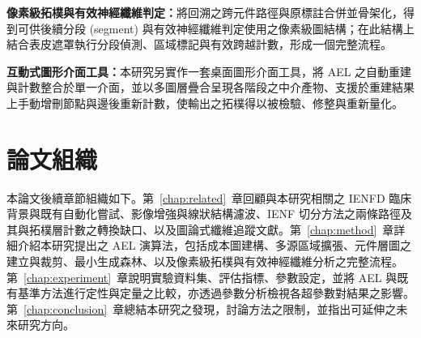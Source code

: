 \textbf{像素級拓樸與有效神經纖維判定：}將回溯之跨元件路徑與原標註合併並骨架化，得到可供後續分段 (segment) 與有效神經纖維判定使用之像素級圖結構；在此結構上結合表皮遮罩執行分段偵測、區域標記與有效跨越計數，形成一個完整流程。

\textbf{互動式圖形介面工具：}本研究另實作一套桌面圖形介面工具，將 AEL 之自動重建與計數整合於單一介面，並以多圖層疊合呈現各階段之中介產物、支援於重建結果上手動增刪節點與邊後重新計數，使輸出之拓樸得以被檢驗、修整與重新量化。

\section{論文組織}
\label{sec:organization}

本論文後續章節組織如下。第~\ref{chap:related}~章回顧與本研究相關之 IENFD 臨床背景與既有自動化嘗試、影像增強與線狀結構濾波、IENF 切分方法之兩條路徑及其與拓樸層計數之轉換缺口、以及圖論式纖維追蹤文獻。第~\ref{chap:method}~章詳細介紹本研究提出之 AEL 演算法，包括成本圖建構、多源區域擴張、元件層圖之建立與裁剪、最小生成森林、以及像素級拓樸與有效神經纖維分析之完整流程。第~\ref{chap:experiment}~章說明實驗資料集、評估指標、參數設定，並將 AEL 與既有基準方法進行定性與定量之比較，亦透過參數分析檢視各超參數對結果之影響。第~\ref{chap:conclusion}~章總結本研究之發現，討論方法之限制，並指出可延伸之未來研究方向。
